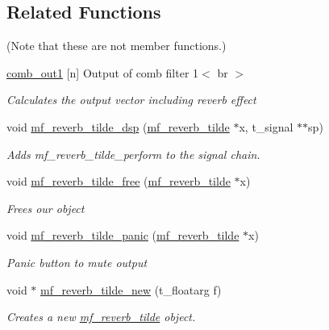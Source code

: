 \subsection*{Related Functions}
(Note that these are not member functions.) \begin{DoxyCompactItemize}
\item 
\mbox{\hyperlink{structmf__reverb__tilde_af0c8d477b1d56aa09fc89d5c532de546}{comb\+\_\+out1}} \mbox{[}n\mbox{]} Output of comb filter 1$<$ br $>$
\begin{DoxyCompactList}\small\item\em Calculates the output vector including reverb effect~\newline
 \end{DoxyCompactList}\item 
void \mbox{\hyperlink{structmf__reverb__tilde_a5fcca42e8b8fbd0e3325c838b890f932}{mf\+\_\+reverb\+\_\+tilde\+\_\+dsp}} (\mbox{\hyperlink{structmf__reverb__tilde}{mf\+\_\+reverb\+\_\+tilde}} $\ast$x, t\+\_\+signal $\ast$$\ast$sp)
\begin{DoxyCompactList}\small\item\em Adds mf\+\_\+reverb\+\_\+tilde\+\_\+perform to the signal chain. ~\newline
 \end{DoxyCompactList}\item 
void \mbox{\hyperlink{structmf__reverb__tilde_a7041f2552459a41548d6fae01b7e3d89}{mf\+\_\+reverb\+\_\+tilde\+\_\+free}} (\mbox{\hyperlink{structmf__reverb__tilde}{mf\+\_\+reverb\+\_\+tilde}} $\ast$x)
\begin{DoxyCompactList}\small\item\em Frees our object~\newline
 \end{DoxyCompactList}\item 
void \mbox{\hyperlink{structmf__reverb__tilde_a61d1ad50d068104d1291bc8ae8c6a8e6}{mf\+\_\+reverb\+\_\+tilde\+\_\+panic}} (\mbox{\hyperlink{structmf__reverb__tilde}{mf\+\_\+reverb\+\_\+tilde}} $\ast$x)
\begin{DoxyCompactList}\small\item\em Panic button to mute output~\newline
 \end{DoxyCompactList}\item 
void $\ast$ \mbox{\hyperlink{structmf__reverb__tilde_a2b9bdb881d12c73657e4b21151c5ab2c}{mf\+\_\+reverb\+\_\+tilde\+\_\+new}} (t\+\_\+floatarg f)
\begin{DoxyCompactList}\small\item\em Creates a new \mbox{\hyperlink{structmf__reverb__tilde}{mf\+\_\+reverb\+\_\+tilde}} object.~\newline

\end{DoxyCompactList}$$
\end{DoxyCompactItemize}
